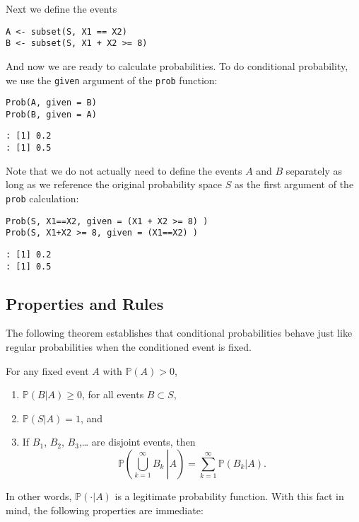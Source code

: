 Next we define the events

\begin{verbatim}
A <- subset(S, X1 == X2)
B <- subset(S, X1 + X2 >= 8)
\end{verbatim}

And now we are ready to calculate probabilities. To do conditional
probability, we use the \texttt{given} argument of the \texttt{prob} function:

\begin{verbatim}
Prob(A, given = B)
Prob(B, given = A)
\end{verbatim}

\begin{verbatim}
: [1] 0.2
: [1] 0.5
\end{verbatim}

Note that we do not actually need to define the events \(A\) and \(B\)
separately as long as we reference the original probability space
\(S\) as the first argument of the \texttt{prob} calculation:

\begin{verbatim}
Prob(S, X1==X2, given = (X1 + X2 >= 8) )
Prob(S, X1+X2 >= 8, given = (X1==X2) )
\end{verbatim}

\begin{verbatim}
: [1] 0.2
: [1] 0.5
\end{verbatim}

\subsection{Properties and Rules}
\label{sec-4-6-2}

The following theorem establishes that conditional probabilities
behave just like regular probabilities when the conditioned event is
fixed.

\begin{thm}
For any fixed event \(A\) with \(\mathbb{P}(A)>0\),
\begin{enumerate}
\item \( \mathbb{P} (B|A)\geq 0 \), for all events \( B \subset S\),
\item \( \mathbb{P} (S|A) = 1 \), and
\item If \(B_{1}\), \(B_{2}\), \(B_{3}\),\ldots{} are disjoint events, then
\begin{equation}
\mathbb{P}\left(\left.\bigcup_{k=1}^{\infty}B_{k}\:\right|A\right)=\sum_{k=1}^{\infty}\mathbb{P}(B_{k}|A).
\end{equation}
\end{enumerate}
\end{thm}
In other words, \(\mathbb{P}(\cdot|A)\) is a legitimate probability
function. With this fact in mind, the following properties are
immediate:

